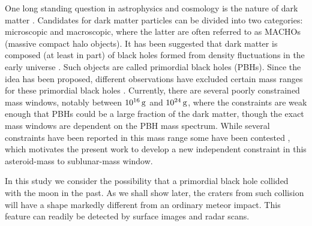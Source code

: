 \documentclass[usenatbib]{mnras}
\begin{document}
One long standing question in astrophysics and cosmology is the nature of dark matter \cite[e.g.][ and reference therein]{Bertone2018HistoryMatter}. Candidates for dark matter particles can be divided into two categories: microscopic and macroscopic, where the latter are often referred to as MACHOs (massive compact halo objects). It has been suggested that dark matter is composed (at least in part) of black holes formed from density fluctuations in the early universe \citep{Carr2016PrimordialMatter}. Such objects are called primordial black holes (PBHs). Since the idea has been proposed, different observations have excluded certain mass ranges for these primordial black holes \citep{Carr2020ConstraintsHoles, Carr2020PrimordialDevelopments}. Currently, there are several poorly constrained mass windows, notably between $10^{16} \, \rm g$ and $10^{24} \, \rm g$, where the constraints are weak enough that PBHs could be a large fraction of the dark matter, though the exact mass windows are dependent on the PBH mass spectrum. While several constraints have been reported in this mass range some have been contested \citep{Katz2018FemtolensingRevisited}, which motivates the present work to develop a new independent constraint in this asteroid-mass to sublunar-mass window.

In this study we consider the possibility that a primordial black hole collided with the moon in the past. As we shall show later, the  craters from such collision will have a shape markedly different from an ordinary meteor impact. This feature can readily be detected by surface images and radar scans. 


\end{document}
